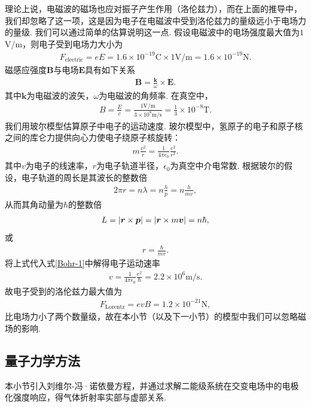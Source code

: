 \documentclass{assignment}
\begin{document}
理论上说，电磁波的磁场也应对振子产生作用（洛伦兹力），而在上面的推导中，我们却忽略了这一项，这是因为电子在电磁波中受到洛伦兹力的量级远小于电场力的量级. 我们可以通过简单的估算说明这一点. 假设电磁波中的电场强度最大值为$1$V/m，则电子受到电场力大小为
\begin{align}
    F_{\text{electric}}=eE=1.6\times 10^{-19}\text{C}\times 1\text{V/m}=1.6\times 10^{-19}\text{N}.
\end{align}
磁感应强度$\bm{B}$与电场$\bm{E}$具有如下关系
\begin{align}
    \bm{B}=\frac{\bm{k}}{\omega}\times\bm{E}.
\end{align}
其中$\bm{k}$为电磁波的波矢，$\omega$为电磁波的角频率.
在真空中，
\begin{align}
    B=\frac{E}{c}=\frac{1\text{V/m}}{3\times 10^8\text{m/s}}=\frac{1}{3}\times 10^{-8}\text{T}.
\end{align}
我们用玻尔模型估算原子中电子的运动速度. 玻尔模型中，氢原子的电子和原子核之间的库仑力提供向心力使电子绕原子核旋转：
\begin{align}
    \label{Bohr-1}
    m\frac{v^2}{r}=\frac{1}{4\pi\epsilon_0}\frac{e^2}{r^2}.
\end{align}
其中$v$为电子的线速率，$r$为电子轨道半径，$\epsilon_0$为真空中介电常数. 根据玻尔的假设，电子轨道的周长是其波长的整数倍
\begin{align}
    2\pi r=n\lambda=n\frac{h}{p}=n\frac{h}{mv},
\end{align}
从而其角动量为$\hbar$的整数倍
\begin{align}
    L=\left\lvert\bm{r}\times\bm{p}\right\rvert=\left\lvert\bm{r}\times m\bm{v}\right\rvert=n\hbar,
\end{align}
或
\begin{align}
    r=\frac{\hbar}{mv}.
\end{align}
将上式代入式\eqref{Bohr-1}中解得电子运动速率
\begin{align}
    v=\frac{1}{4\pi\epsilon_0}\frac{e^2}{\hbar}=2.2\times 10^6\text{m/s}.
\end{align}
故电子受到的洛伦兹力最大值为
\begin{align}
    F_{\text{Lorentz}}=evB=1.2\times 10^{-21}\text{N},
\end{align}
比电场力小了两个数量级，故在本小节（以及下一小节）的模型中我们可以忽略磁场的影响.

\subsection{量子力学方法}
本小节引入刘维尔-冯·诺依曼方程，并通过求解二能级系统在交变电场中的电极化强度响应，得气体折射率实部与虚部关系.
\end{document}
